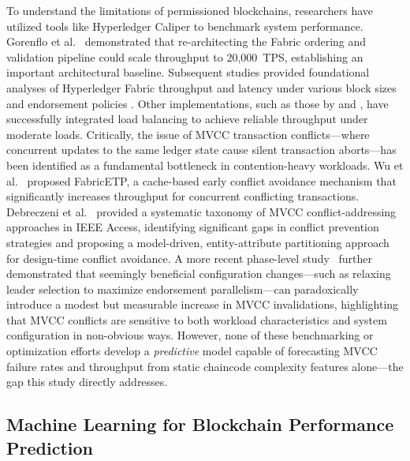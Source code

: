 \documentclass[12pt]{article}
\begin{document}
To understand the limitations of permissioned blockchains, researchers have utilized tools like Hyperledger Caliper to benchmark system performance. Gorenflo et al.~\citep{gorenflo_fastfabric_2019} demonstrated that re-architecting the Fabric ordering and validation pipeline could scale throughput to 20,000~TPS, establishing an important architectural baseline. Subsequent studies provided foundational analyses of Hyperledger Fabric throughput and latency under various block sizes and endorsement policies \citep{thakkar_performance_2018,el_hajji_optimization_2024}. Other implementations, such as those by \cite{kumar_integrating_2026} and \cite{kaushal_convergence_2025}, have successfully integrated load balancing to achieve reliable throughput under moderate loads. Critically, the issue of MVCC transaction conflicts---where concurrent updates to the same ledger state cause silent transaction aborts---has been identified as a fundamental bottleneck in contention-heavy workloads. Wu et al.~\citep{wu_fabricetp_2023} proposed FabricETP, a cache-based early conflict avoidance mechanism that significantly increases throughput for concurrent conflicting transactions. Debreczeni et al.~\citep{debreczeni_transaction_2024} provided a systematic taxonomy of MVCC conflict-addressing approaches in IEEE Access, identifying significant gaps in conflict prevention strategies and proposing a model-driven, entity-attribute partitioning approach for design-time conflict avoidance. A more recent phase-level study~\citep{gorenflo_endtoend_2026} further demonstrated that seemingly beneficial configuration changes---such as relaxing leader selection to maximize endorsement parallelism---can paradoxically introduce a modest but measurable increase in MVCC invalidations, highlighting that MVCC conflicts are sensitive to both workload characteristics and system configuration in non-obvious ways. However, none of these benchmarking or optimization efforts develop a \textit{predictive} model capable of forecasting MVCC failure rates and throughput from static chaincode complexity features alone---the gap this study directly addresses.

\subsection{Machine Learning for Blockchain Performance Prediction}
\end{document}

